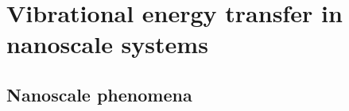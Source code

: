 




\section{Vibrational energy transfer in nanoscale systems}

\subsection{Nanoscale phenomena}



